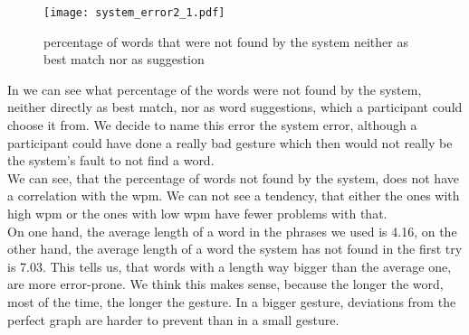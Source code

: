 \begin{figure}[H]
    \centering
    \texttt{[image: system\_error2\_1.pdf]}
    \caption{percentage of words that were not found by the system neither as best match nor as suggestion}
    \label{fig:error_system}
\end{figure}


In  we can see what percentage of the words were not found by the system, neither directly as best match, nor as word suggestions, which a participant could choose it from. We decide to name this error the system error, although a participant could have done a really bad gesture which then would not really be the system's fault to not find a word.\\
We can see, that the percentage of words not found by the system, does not have a correlation with the wpm. We can not see a tendency, that either the ones with high wpm or the ones with low wpm have fewer problems with that.\\
On one hand, the average length of a word in the phrases we used is 4.16, on the other hand, the average length of a word the system has not found in the first try is 7.03. This tells us, that words with a length way bigger than the average one, are more error-prone. We think this makes sense, because the longer the word, most of the time, the longer the gesture. In a bigger gesture, deviations from the perfect graph are harder to prevent than in a small gesture.

